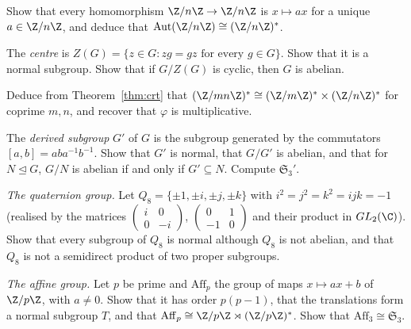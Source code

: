 \begin{exercise}[$\star$]\label{ex:autzn}
Show that every homomorphism $\Z/n\Z\to\Z/n\Z$ is $x\mapsto ax$ for a unique $a\in\Z/n\Z$, and deduce that $\operatorname{Aut}(\Z/n\Z)\cong(\Z/n\Z)^*$.
\end{exercise}

\begin{exercise}[$\star$]\label{ex:centre}
The \emph{centre} is $Z(G)=\{z\in G:zg=gz\text{ for every }g\in G\}$. Show that it is a normal subgroup. Show that if $G/Z(G)$ is cyclic, then $G$ is abelian.
\end{exercise}

\begin{exercise}[$\star$]\label{ex:phimult}
Deduce from Theorem~\ref{thm:crt} that $(\Z/mn\Z)^*\cong(\Z/m\Z)^*\times(\Z/n\Z)^*$ for coprime $m,n$, and recover that $\varphi$ is multiplicative.
\end{exercise}

\begin{exercise}[$\star\star$]\label{ex:commutator}
The \emph{derived subgroup} $G'$ of $G$ is the subgroup generated by the commutators $[a,b]=aba^{-1}b^{-1}$. Show that $G'$ is normal, that $G/G'$ is abelian, and that for $N\trianglelefteq G$, $G/N$ is abelian if and only if $G'\subseteq N$. Compute $\mathfrak S_3'$.
\end{exercise}

\begin{exercise}[$\star\star$]\label{ex:quaternion}
\emph{The quaternion group.} Let $Q_8=\{\pm1,\pm i,\pm j,\pm k\}$ with $i^2=j^2=k^2=ijk=-1$ (realised by the matrices $\begin{pmatrix}i&0\\0&-i\end{pmatrix}$, $\begin{pmatrix}0&1\\-1&0\end{pmatrix}$ and their product in $GL_2(\C)$). Show that every subgroup of $Q_8$ is normal although $Q_8$ is not abelian, and that $Q_8$ is not a semidirect product of two proper subgroups.
\end{exercise}

\begin{exercise}[$\star\star$]\label{ex:affine}
\emph{The affine group.} Let $p$ be prime and $\mathrm{Aff}_p$ the group of maps $x\mapsto ax+b$ of $\Z/p\Z$, with $a\ne0$. Show that it has order $p(p-1)$, that the translations form a normal subgroup $T$, and that $\mathrm{Aff}_p\cong\Z/p\Z\rtimes(\Z/p\Z)^*$. Show that $\mathrm{Aff}_3\cong\mathfrak S_3$.
\end{exercise}

